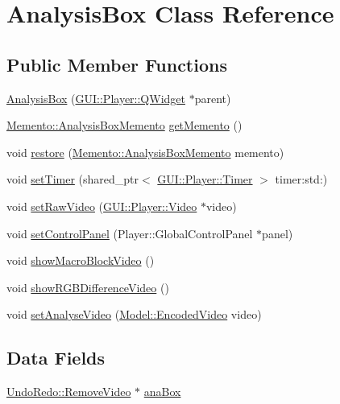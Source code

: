 \hypertarget{classGUI_1_1AnalysisBox}{}\section{Analysis\+Box Class Reference}
\label{classGUI_1_1AnalysisBox}
\subsection*{Public Member Functions}
\begin{DoxyCompactItemize}
\item 
\hyperlink{classGUI_1_1AnalysisBox_a4ae2ada67e406d409a624f57c52235f4}{Analysis\+Box} (\hyperlink{classGUI_1_1Player_1_1QWidget}{G\+U\+I\+::\+Player\+::\+Q\+Widget} $\ast$parent)
\item 
\hyperlink{classMemento_1_1AnalysisBoxMemento}{Memento\+::\+Analysis\+Box\+Memento} \hyperlink{classGUI_1_1AnalysisBox_a73fa952c3fb3509d83ca1dadc7cefb33}{get\+Memento} ()
\item 
void \hyperlink{classGUI_1_1AnalysisBox_a70c1d51815b73ad12b08cbf0636e77eb}{restore} (\hyperlink{classMemento_1_1AnalysisBoxMemento}{Memento\+::\+Analysis\+Box\+Memento} memento)
\item 
void \hyperlink{classGUI_1_1AnalysisBox_a0a63304dda40cabeda44acd79bb08b59}{set\+Timer} (shared\+\_\+ptr$<$ \hyperlink{classGUI_1_1Player_1_1Timer}{G\+U\+I\+::\+Player\+::\+Timer} $>$ timer\+:std\+:)
\item 
void \hyperlink{classGUI_1_1AnalysisBox_ae45e621cb87a85ffb069ac765a306711}{set\+Raw\+Video} (\hyperlink{classGUI_1_1Player_1_1Video}{G\+U\+I\+::\+Player\+::\+Video} $\ast$video)
\item 
void \hyperlink{classGUI_1_1AnalysisBox_a9c1b482d1dcd6a733b84a9cdcc960263}{set\+Control\+Panel} (Player\+::\+Global\+Control\+Panel $\ast$panel)
\item 
void \hyperlink{classGUI_1_1AnalysisBox_a9484911b10192b865138995df1158d7e}{show\+Macro\+Block\+Video} ()
\item 
void \hyperlink{classGUI_1_1AnalysisBox_a17b13bec505d0e1f579bdfa7f691f085}{show\+R\+G\+B\+Difference\+Video} ()
\item 
void \hyperlink{classGUI_1_1AnalysisBox_ab047270e0ea8ceb6504fb52d7b06dade}{set\+Analyse\+Video} (\hyperlink{classModel_1_1EncodedVideo}{Model\+::\+Encoded\+Video} video)
\end{DoxyCompactItemize}
\subsection*{Data Fields}
\begin{DoxyCompactItemize}
\item 
\hyperlink{classUndoRedo_1_1RemoveVideo}{Undo\+Redo\+::\+Remove\+Video} $\ast$ \hyperlink{classGUI_1_1AnalysisBox_a2872ec622eeebd8ec665f83b2eafa7b5}{ana\+Box}
\end{DoxyCompactItemize}


